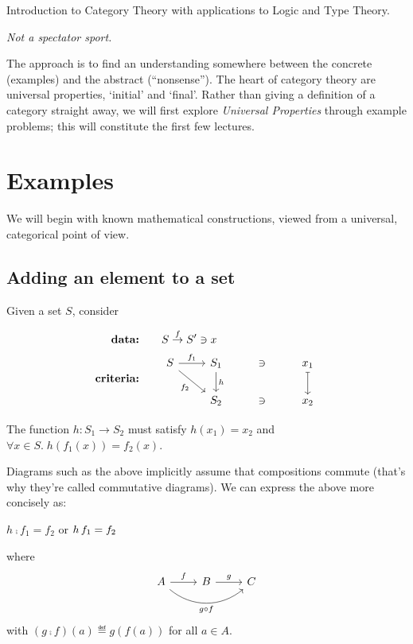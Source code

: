 Introduction to Category Theory with applications to Logic and Type Theory.

\emph{Not a spectator sport.}

The approach is to find an understanding somewhere between the concrete
(examples) and the abstract (``nonsense''). The heart of category theory are
universal properties, `initial' and `final'.
Rather than giving a definition of a category straight away, we will first
explore \emph{Universal Properties} through example problems; this will
constitute the first few lectures.

\section{Examples}
We will begin with known mathematical constructions, viewed from a universal,
categorical point of view.

\subsection{Adding an element to a set}
\label{add-element-set}

Given a set $S$, consider

\begin{align*}
    \textbf{data:}&\qquad S \overset{f}{\rightarrow} S^\prime \ni x \\
    \textbf{criteria:}& \qquad
    \begin{tikzcd}[ampersand replacement=\&]
        S \arrow[r, "f_1"]
          \arrow[dr, swap, "f_2"]
          \&
        S_1 \arrow[d, "h"] \& \ni \& x_1 \arrow[d, mapsto]
          \\
          {}\&
        S_2 \& \ni \& x_2
    \end{tikzcd}
\end{align*}

The function $h : S_1 \rightarrow S_2$ must satisfy $h(x_1) = x_2$ and
$\forall x \in S .\; h(f_1(x)) = f_2(x)$.

\begin{framed}
Diagrams such as the above implicitly assume that compositions commute (that's
why they're called commutative diagrams). We can express the above more
concisely as:
\begin{center}
$h\comp f_1 = f_2$
\quad or \quad
$h\, f_1 = f_2$
\end{center}
where
$$
\begin{tikzcd}
    A \arrow[r, "f"] \arrow[rr, swap, bend right=40, "g \circ f"] & B \arrow[r, "g"] & C
\end{tikzcd}
$$
with $(g\comp f)(a)\eqdef g(f(a))$ for all $a\in A$.
\end{framed}

